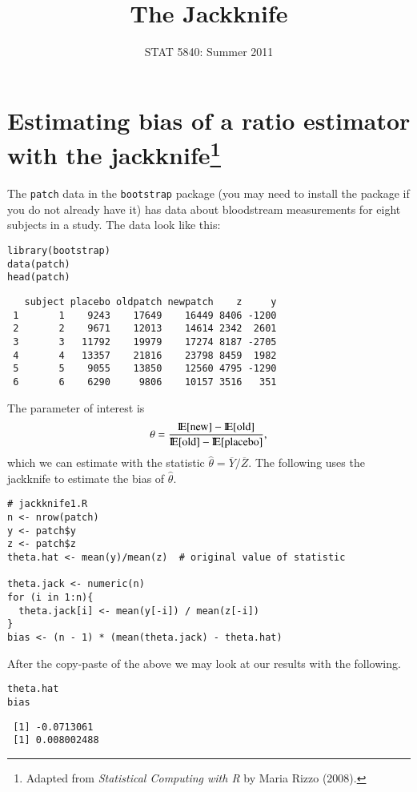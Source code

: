 \documentclass[11pt,english]{article}
\title{The Jackknife}
\date{STAT 5840: Summer 2011}
\begin{document}
\maketitle

\thispagestyle{empty}

\section*{Estimating bias of a ratio estimator with the jackknife\protect\footnote{Adapted from \emph{Statistical Computing with R} by Maria Rizzo (2008). }}
\label{sec-1}

The \texttt{patch} data in the \texttt{bootstrap} package (you may need to install the package if you do not already have it) has data about bloodstream measurements for eight subjects in a study.  The data look like this:
\begin{verbatim}
library(bootstrap)
data(patch)
head(patch)
\end{verbatim}

\begin{verbatim}
   subject placebo oldpatch newpatch    z     y
 1       1    9243    17649    16449 8406 -1200
 2       2    9671    12013    14614 2342  2601
 3       3   11792    19979    17274 8187 -2705
 4       4   13357    21816    23798 8459  1982
 5       5    9055    13850    12560 4795 -1290
 6       6    6290     9806    10157 3516   351
\end{verbatim}


The parameter of interest is
\[
\theta = \frac{\mathrm{I\hspace{-1.5pt}E}[\mathrm{new}] - \mathrm{I\hspace{-1.5pt}E}[\mathrm{old}]}{\mathrm{I\hspace{-1.5pt}E}[\mathrm{old}] - \mathrm{I\hspace{-1.5pt}E}[\mathrm{placebo}]},
\]
which we can estimate with the statistic \(\hat{\theta} = \overline{Y}/\overline{Z}\).  The following uses the jackknife to estimate the bias of $\hat{\theta}$.

\begin{verbatim}
# jackknife1.R
n <- nrow(patch)
y <- patch$y
z <- patch$z
theta.hat <- mean(y)/mean(z)  # original value of statistic

theta.jack <- numeric(n)
for (i in 1:n){
  theta.jack[i] <- mean(y[-i]) / mean(z[-i])
}
bias <- (n - 1) * (mean(theta.jack) - theta.hat)
\end{verbatim}

After the copy-paste of the above we may look at our results with the following.
\begin{verbatim}
theta.hat
bias
\end{verbatim}

\begin{verbatim}
 [1] -0.0713061
 [1] 0.008002488
\end{verbatim}
\end{document}

